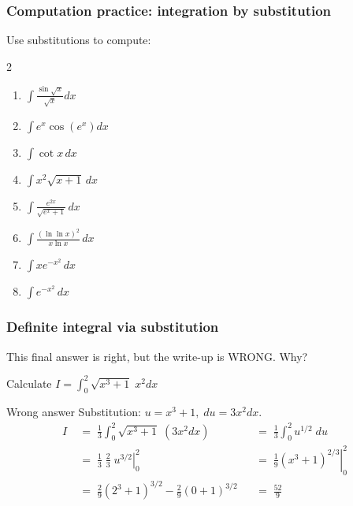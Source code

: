 \documentclass[14pt]{beamer}
\begin{document}
\begin{frame}[t]
	\frametitle{Computation practice: integration by substitution}

	Use substitutions to compute:
	\begin{multicols}{2}
		\begin{enumerate}
			\item $\displaystyle \int \frac{\sin \sqrt{x}}{\sqrt{x}}dx$
				\vspace{.2cm}

			\item $\displaystyle \int e^{x}\cos \left(e^{x}\right) dx$
				\vspace{.2cm}

			\item $\displaystyle \int \cot x \, dx$
				\vspace{.2cm}

			\item $\displaystyle \int x^{2}\sqrt{x+1}\, dx$
				\vspace{.2cm}

			\item $\displaystyle \int \frac{e^{2x}}{\sqrt{e^{x}+ 1}}\, dx$
				\vspace{.2cm}

			\item $\displaystyle \int \frac{\left( \ln \ln x \right)^{2}}{ x \ln x}\, d
				x$
				\vspace{.2cm}

			\item $\displaystyle \int x e^{-x^2}\, dx$
				\vspace{.2cm}

			\item $\displaystyle \int e^{-x^2}\, dx$
				\vspace{.2cm}
		\end{enumerate}
	\end{multicols}
\end{frame}

\begin{frame}
	\fontsize{13}{13}\selectfont
	\frametitle{Definite integral via substitution}

	This final answer is right, but the write-up is WRONG. Why?
	\vfill

	Calculate $\displaystyle I = \int_{0}^{2}\sqrt{x^{3}+1}\; x^{2}dx$
	\begin{block}{Wrong answer}
		Substitution: $\displaystyle u = x^{3}+1, \; du=3x^{2}dx$.
		\begin{align*}
			I \; & = \; \frac{1}{3}\int_{0}^{2}\sqrt{x^{3}+1}\; (3x^{2}dx)                             &  & = \; \frac{1}{3}\int_{0}^{2}u^{1/2}\; du                             \\
			     & = \; \frac{1}{3}\; \frac{2}{3}\; \left. u^{3/2}\right\vert_{0}^{2}                  &  & = \; \left. \frac{1}{9}\left(x^{3}+1\right)^{2/3}\right\vert_{0}^{2} \\
			     & = \; \frac{2}{9}\left( 2^{3}+ 1 \right)^{3/2}- \frac{2}{9}\left( 0 + 1\right)^{3/2} &  & = \; \frac{52}{9}
		\end{align*}
	\end{block}
\end{frame}
\end{document}
